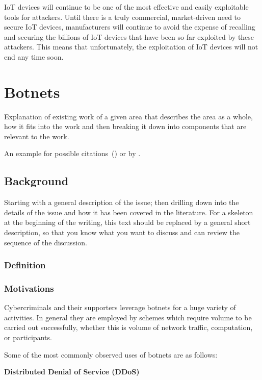 IoT devices will continue to be one of the most effective and easily exploitable tools for attackers. Until there is a truly commercial, market-driven need to secure IoT devices, manufacturers will continue to avoid the expense of recalling and securing the billions of IoT devices that have been so far exploited by these attackers. This means that unfortunately, the exploitation of IoT devices will
not end any time soon.



\section{Botnets}

Explanation of existing work of a given area that describes the area as a whole, how it fits into the work and then breaking it down into components that are relevant to the work.

An example for possible citations~(\cite{Andrew2013empirical}) or by \cite{Asghari2015Economics}.

\subsection{Background}

Starting with a general description of the issue; then drilling down into the details of the issue and how it has been covered in the literature. For a skeleton at the beginning of the writing, this text should be replaced by a general short description, so that you know what you want to discuss and can review the sequence of the discussion.

\subsubsection{Definition}
\subsubsection{Motivations}
Cybercriminals and their supporters leverage botnets for a huge variety of activities. In general they are employed by schemes which require volume to be carried out successfully, whether this is volume of network traffic, computation, or participants.

Some of the most commonly observed uses of botnets are as follows:

\bullet \textbf{Distributed Denial of Service (DDoS)}


